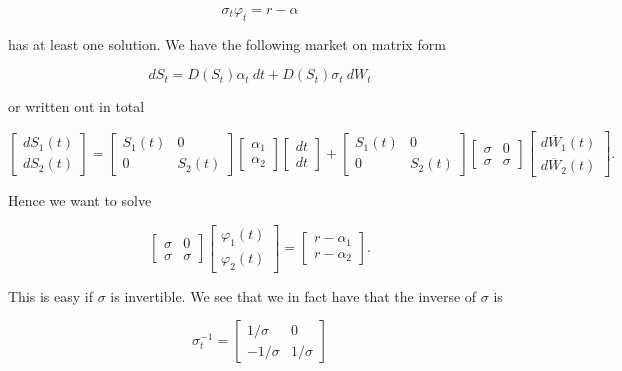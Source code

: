 \documentclass[
]{book}
\begin{document}
\[
\sigma_t\varphi_t=r-\alpha
\]

has at least one solution. We have the following market on matrix form

\[
dS_t=D(S_t)\alpha_t\ dt+D(S_t)\sigma _t\ dW_t
\]

or written out in total

\[
\begin{bmatrix}
dS_1(t)\\
dS_2(t)
\end{bmatrix}
=
\begin{bmatrix}
S_1(t) & 0\\
0 & S_2(t)
\end{bmatrix}
\begin{bmatrix}
\alpha_1\\
\alpha_2
\end{bmatrix}
\begin{bmatrix}
dt\\
dt
\end{bmatrix}
+
\begin{bmatrix}
S_1(t) & 0\\
0 & S_2(t)
\end{bmatrix}
\begin{bmatrix}
\sigma & 0\\
\sigma & \sigma
\end{bmatrix}
\begin{bmatrix}
d\overline{W}_1(t)\\
d\overline{W}_2(t)
\end{bmatrix}.
\]

Hence we want to solve

\[
\begin{bmatrix}
\sigma & 0\\
\sigma & \sigma
\end{bmatrix}\begin{bmatrix}
\varphi_1(t)\\
\varphi_2(t)
\end{bmatrix}=
\begin{bmatrix}
r-\alpha_1\\
r-\alpha_2
\end{bmatrix}.
\]

This is easy if \(\sigma\) is invertible. We see that we in fact have that the inverse of \(\sigma\) is

\[
\sigma_t^{-1}=\begin{bmatrix}
1/\sigma & 0\\
-1/\sigma & 1/\sigma
\end{bmatrix}
\]
\end{document}
